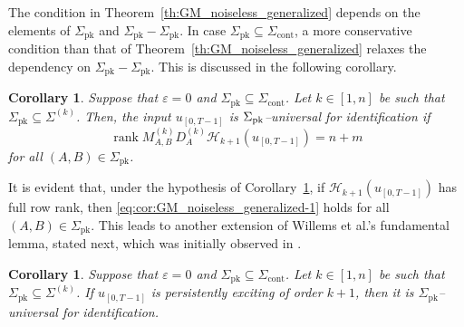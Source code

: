 \documentclass[journal,twoside,web]{ieeecolor}
\DeclareMathOperator{\rank}{rank}
\newtheorem{corollary}[theorem]{Corollary}
\begin{document}

The condition in Theorem~\ref{th:GM_noiseless_generalized} depends on the elements of $\Sigma_\text{pk}$ and $\Sigma_\text{pk}-\Sigma_\text{pk}$. In case $\Sigma_\text{pk}\subseteq\Sigma_\text{cont}$, a more conservative condition than that of Theorem~\ref{th:GM_noiseless_generalized} relaxes the dependency on $\Sigma_\text{pk}-\Sigma_\text{pk}$. This is discussed in the following corollary. 

\begin{corollary}
\label{cor:GM_noiseless_generalized_prime}
Suppose that $\varepsilon=0$ and $\Sigma_\text{pk}\subseteq\Sigma_\text{cont}$. Let $k\in[1,n]$ be such that $\Sigma_\text{pk}\subseteq\Sigma^{(k)}$. Then, the input $u_{[0,T-1]}$ is $\Sigma_\textup{pk}$--universal for identification if 
\begin{equation}
\label{eq:cor:GM_noiseless_generalized-1}
\rank M_{A,B}^{(k)}D_A^{(k)}\mathcal{H}_{k+1}(u_{[0,T-1]})=n+m
\end{equation}
for all $(A,B)\in\Sigma_\text{pk}$.
\end{corollary}

It is evident that, under the hypothesis of Corollary~\ref{cor:GM_noiseless_generalized_prime}, if $\mathcal{H}_{k+1}(u_{[0,T-1]})$ has full row rank, then \eqref{eq:cor:GM_noiseless_generalized-1} holds for all $(A,B)\in\Sigma_\text{pk}$. This leads to another extension of Willems et al.'s fundamental lemma, stated next, which was initially observed in \cite[Cor. 1]{yu2021controllability}. 

\begin{corollary}
\label{cor:Willems_generalized}
Suppose that $\varepsilon=0$ and $\Sigma_\text{pk}\subseteq\Sigma_\text{cont}$. Let \mbox{$k\in[1,n]$} be such that $\Sigma_\text{pk}\subseteq\Sigma^{(k)}$. If $u_{[0,T-1]}$ is persistently exciting of order $k+1$, then it is $\Sigma_\text{pk}$--universal for identification.
\end{corollary}
\end{document}
